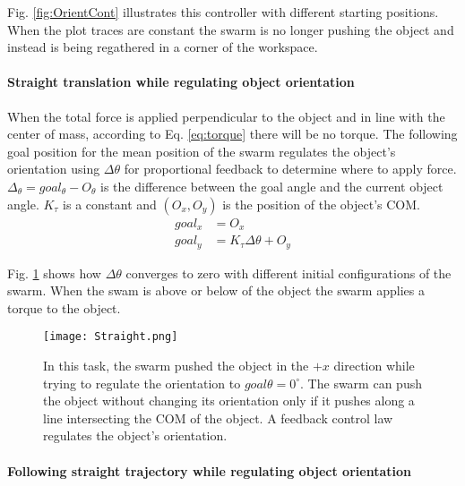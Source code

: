 Fig. \ref{fig:OrientCont} illustrates this controller with different starting positions. When the plot traces are constant the swarm is no longer pushing the object and instead is being regathered in a corner of the workspace. 

\paragraph{Straight translation while regulating object orientation} \label{para:PureTranslation}

When the total force is applied perpendicular to the object and in line with the center of mass, according to Eq. \ref{eq:torque} there will be no torque. 
The following goal position for the mean position of the swarm regulates the object's orientation using $\Delta \theta$ for proportional feedback  to determine where to apply force.
$\Delta_\theta = goal_\theta - O_\theta$ is the difference between the goal angle and the current object angle.
 $K_\tau$ is a constant and $(O_x,O_y)$ is the position of the object's COM.
\begin{align}
goal_x &= O_x \nonumber \\
goal_y &= K_\tau \Delta\theta + O_y  \label{eq:TranslationAndOrientation}
\end{align}

 Fig. \ref{fig:Straight} shows how $\Delta \theta$ converges to zero with different initial configurations of the swarm. When the swam is above or below of the object the swarm applies a torque to the object.
 
 
\begin{figure}
\begin{center}
	\texttt{[image: Straight.png]}
\end{center}
\vspace{-1em}
\caption{\label{fig:Straight}
In this task, the swarm pushed the object in the $+x$ direction while trying to regulate the orientation to $goal\theta = 0^\circ$.
 The swarm can push the object without changing its orientation only if it pushes along a line intersecting the COM of the object.  A feedback control law regulates the object's orientation.
}
\vspace{-1em}
\end{figure}

\paragraph{Following straight trajectory while regulating object orientation} \label{para:PureTranslation}


